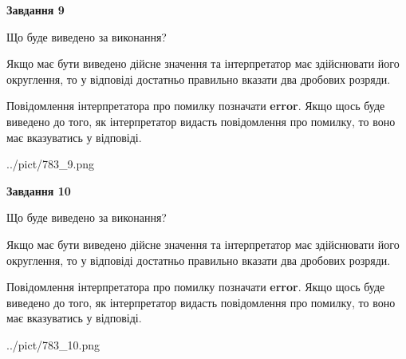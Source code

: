 \documentclass[12pt, ukrainian]{article}
\begin{document}
{\begin {Large}
{\begin {center}\textbf{Завдання 9}\end {center}}\par
Що буде виведено за виконання? \par

Якщо має бути виведено дійсне значення та інтерпретатор має здійснювати його округлення, 
то у відповіді достатньо правильно вказати два дробових розряди.

Повідомлення інтерпретатора про помилку позначати \textbf{error}.
Якщо щось буде виведено до того, як інтерпретатор видасть повідомлення про помилку, 
то воно має вказуватись у відповіді. \par

\begin{center}
	{../pict/783_9.png}
\end{center}
\newpage

{\begin {center}\textbf{Завдання 10}\end {center}}\par
Що буде виведено за виконання? \par

Якщо має бути виведено дійсне значення та інтерпретатор має здійснювати його округлення, 
то у відповіді достатньо правильно вказати два дробових розряди.

Повідомлення інтерпретатора про помилку позначати \textbf{error}.
Якщо щось буде виведено до того, як інтерпретатор видасть повідомлення про помилку, 
то воно має вказуватись у відповіді. \par

\begin{center}
	{../pict/783_10.png}
\end{center}
\newpage

\end {Large}}
\end{document}
